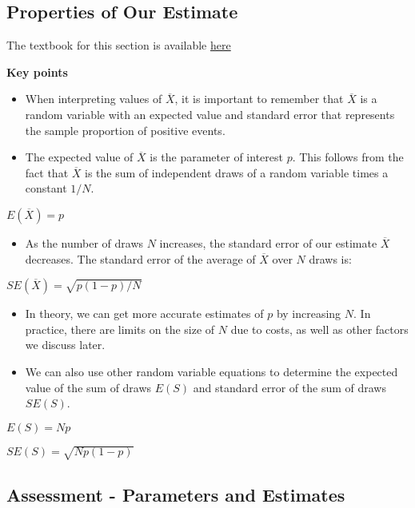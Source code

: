 \documentclass[
]{article}
\providecommand{\tightlist}{%
  \setlength{\itemsep}{0pt}\setlength{\parskip}{0pt}}
\begin{document}
\hypertarget{properties-of-our-estimate}{%
\subsection{Properties of Our
Estimate}\label{properties-of-our-estimate}}

The textbook for this section is available
\href{https://rafalab.github.io/dsbook/inference.html\#properties-of-our-estimate-expected-value-and-standard-error}{here}

\textbf{Key points}

\begin{itemize}
\tightlist
\item
  When interpreting values of \(\overline{X}\), it is important to
  remember that \(\overline{X}\) is a random variable with an expected
  value and standard error that represents the sample proportion of
  positive events.
\item
  The expected value of \(\overline{X}\) is the parameter of interest
  \(p\). This follows from the fact that \(\overline{X}\) is the sum of
  independent draws of a random variable times a constant \(1/N\).
\end{itemize}

\(E(\overline{X}) = p\)

\begin{itemize}
\tightlist
\item
  As the number of draws \(N\) increases, the standard error of our
  estimate \(\overline{X}\) decreases. The standard error of the average
  of \(\overline{X}\) over \(N\) draws is:
\end{itemize}

\(SE(\overline{X}) = \sqrt{p(1-p)/N}\)

\begin{itemize}
\tightlist
\item
  In theory, we can get more accurate estimates of \(p\) by increasing
  \(N\). In practice, there are limits on the size of \(N\) due to
  costs, as well as other factors we discuss later.
\item
  We can also use other random variable equations to determine the
  expected value of the sum of draws \(E(S)\) and standard error of the
  sum of draws \(SE(S)\).
\end{itemize}

\(E(S) = Np\)

\(SE(S) = \sqrt{Np(1-p)}\)

\hypertarget{assessment---parameters-and-estimates}{%
\subsection{Assessment - Parameters and
Estimates}\label{assessment---parameters-and-estimates}}
\end{document}
